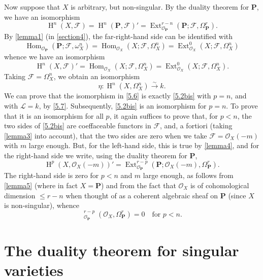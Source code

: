 \documentclass{article}
\theoremstyle{plain}
\theoremstyle{definition}
\newcommand{\sh}{\mathscr}
\newcommand{\bb}{\mathbf}
\renewcommand{\leq}{\leqslant}
\DeclareMathOperator{\Ext}{Ext}
\DeclareMathOperator{\Hom}{Hom}
\DeclareMathOperator{\shExt}{\underline{Ext}}
\DeclareMathOperator{\HH}{H}
\newcommand{\oldpage}[1]{\marginpar{\footnotesize$\Big\vert$ \textit{p.~#1}}}
\begin{document}
Now suppose that $X$ is arbitrary, but non-singular.
By the duality theorem for $\bb{P}$, we have an isomorphism
\[
  \HH^n(X,\sh{F})
  = \HH^n(\bb{P},\sh{F})'
  = \Ext_{\sh{O}_\bb{P}}^{r-n}(\bb{P};\sh{F},\Omega_\bb{P}^r).
\]
By \cref{lemma1} (in \cref{section4}), the far-right-hand side can be identified with
\[
  \Hom_{\sh{O}_\bb{P}}(\bb{P};\sh{F},\omega_X^n)
  = \Hom_{\sh{O}_X}(X;\sh{F},\Omega_X^n)
  = \Ext_{\sh{O}_X}^0(X;\sh{F},\Omega_X^n)
\]
whence we have an isomorphism
\[
\label{5.6}
  \HH^n(X,\sh{F})'
  = \Hom_{\sh{O}_X}(X;\sh{F},\Omega_X^n)
  = \Ext_{\sh{O}_X}^0(X;\sh{F},\Omega_X^n).
\tag{5.6}
\]
Taking $\sh{F}=\Omega_X^n$, we obtain an isomorphism
\[
\label{5.7}
  \eta\colon \HH^n(X,\Omega_X^n) \xrightarrow{\sim} k.
\tag{5.7}
\]
\oldpage{149-17}
We can prove that the isomorphism in \cref{5.6} is exactly \cref{5.2bis} with $p=n$, and with $\sh{L}=k$, by \cref{5.7}.
Subsequently, \cref{5.2bis} is an isomorphism for $p=n$.
To prove that it is an isomorphism for all $p$, it again suffices to prove that, for $p<n$, the two sides of \cref{5.2bis} are coeffaceable functors in $\sh{F}$, and, a fortiori (taking \cref{lemma3} into account), that the two sides are zero when we take $\sh{F}=\sh{O}_X(-m)$ with $m$ large enough.
But, for the left-hand side, this is true by \cref{lemma4}, and for the right-hand side we write, using the duality theorem for $\bb{P}$,
\[
  \HH^p(X,\sh{O}_X(-m))'
  = \Ext_{\sh{O}_\bb{P}}^{r-p}(\bb{P};\sh{O}_X(-m),\Omega_\bb{P}^r).
\]
The right-hand side is zero for $p<n$ and $m$ large enough, as follows from \cref{lemma5} (where in fact $X=\bb{P}$) and from the fact that $\sh{O}_X$ is of cohomological dimension $\leq r-n$ when thought of as a coherent algebraic sheaf on $\bb{P}$ (since $X$ is non-singular), whence
\[
  \shExt_{\sh{O}_\bb{P}}^{r-p}(\sh{O}_X,\Omega_\bb{P}^r) = 0
  \quad\mbox{for $p<n$.}
\]


\section{The duality theorem for singular varieties}
\label{section6}
\end{document}

